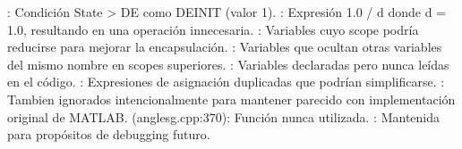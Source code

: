 {}: Condición State\markdownRendererUnderscore{} > DE como DE\markdownRendererUnderscore{}INIT (valor 1).\markdownRendererInterblockSeparator
{}: Expresión 1.0 / d donde d = 1.0, resultando en una operación innecesaria.\markdownRendererInterblockSeparator
{}: Variables cuyo scope podría reducirse para mejorar la encapsulación.\markdownRendererInterblockSeparator
{}: Variables que ocultan otras variables del mismo nombre en scopes superiores.\markdownRendererInterblockSeparator
{}: Variables declaradas pero nunca leídas en el código.\markdownRendererInterblockSeparator
{}: Expresiones de asignación duplicadas que podrían simplificarse.\markdownRendererInterblockSeparator
{}: Tambien ignorados intencionalmente para mantener parecido con implementación original de MATLAB.\markdownRendererInterblockSeparator
{}
\markdownRendererSectionEnd \markdownRendererSectionBegin
{}\markdownRendererInterblockSeparator
{}\markdownRendererUlBeginTight
\markdownRendererUlItem {} (anglesg.cpp:370): Función  nunca utilizada.\markdownRendererUlItemEnd 
\markdownRendererUlEndTight \markdownRendererInterblockSeparator
{}: Mantenida para propósitos de debugging futuro.
\markdownRendererSectionEnd 
\markdownRendererSectionEnd 
\markdownRendererSectionEnd \markdownRendererDocumentEnd